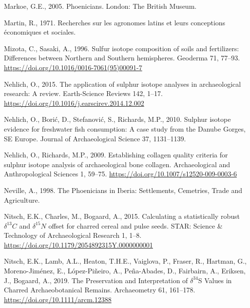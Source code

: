 \documentclass[preprint, 3p, authoryear]{elsarticle} %
\newlength{\cslhangindent}
\newlength{\cslentryspacingunit} %
\newenvironment{CSLReferences}[2] %
 {%
  \setlength{\parindent}{0pt}
  \ifodd #1
  \let\oldpar\par
  \def\par{\hangindent=\cslhangindent\oldpar}
  \fi
  \setlength{\parskip}{#2\cslentryspacingunit}
 }%
 {}
\begin{document}
\begin{CSLReferences}{1}{0}
\leavevmode{}%
Markoe, G.E., 2005. Phoenicians. {London}: {The British Museum}.

\leavevmode{}%
Martin, R., 1971. Recherches sur les agronomes latins et leurs conceptions économiques et sociales.

\leavevmode{}%
Mizota, C., Sasaki, A., 1996. Sulfur isotope composition of soils and fertilizers: {Differences} between {Northern} and {Southern} hemispheres. Geoderma 71, 77--93. \url{https://doi.org/10.1016/0016-7061(95)00091-7}

\leavevmode{}%
Nehlich, O., 2015. The application of sulphur isotope analyses in archaeological research: {A} review. Earth-Science Reviews 142, 1--17. \url{https://doi.org/10.1016/j.earscirev.2014.12.002}

\leavevmode{}%
Nehlich, O., Borić, D., Stefanović, S., Richards, M.P., 2010. Sulphur isotope evidence for freshwater fish consumption: A case study from the {Danube Gorges}, {SE Europe}. Journal of Archaeological Science 37, 1131--1139.

\leavevmode{}%
Nehlich, O., Richards, M.P., 2009. Establishing collagen quality criteria for sulphur isotope analysis of archaeological bone collagen. Archaeological and Anthropological Sciences 1, 59--75. \url{https://doi.org/10.1007/s12520-009-0003-6}

\leavevmode{}%
Neville, A., 1998. The {Phoenicians} in {Iberia}: {Settlements}, {Cemetries}, {Trade} and {Agriculture}.

\leavevmode{}%
Nitsch, E.K., Charles, M., Bogaard, A., 2015. Calculating a statistically robust \(\delta ^{13}C\) and \(\delta ^{15}N\) offset for charred cereal and pulse seeds. STAR: Science \& Technology of Archaeological Research 1, 1--8. \url{https://doi.org/10.1179/2054892315Y.0000000001}

\leavevmode{}%
Nitsch, E.K., Lamb, A.L., Heaton, T.H.E., Vaiglova, P., Fraser, R., Hartman, G., Moreno-Jiménez, E., López-Piñeiro, A., Peña-Abades, D., Fairbairn, A., Eriksen, J., Bogaard, A., 2019. The {Preservation} and {Interpretation} of {\(\delta^{34}\)S Values} in {Charred Archaeobotanical Remains}. Archaeometry 61, 161--178. \url{https://doi.org/10.1111/arcm.12388}


\end{CSLReferences}
\end{document}
